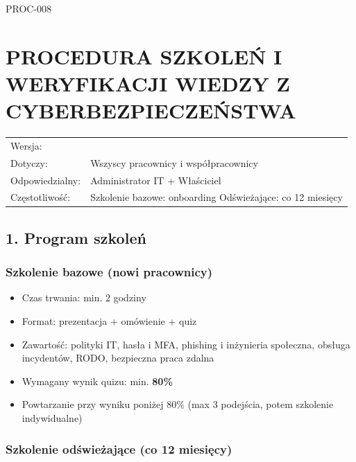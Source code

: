 \documentclass[12pt,a4paper]{article}
\providecommand{\tightlist}{\setlength{\itemsep}{0pt}\setlength{\parskip}{0pt}}
\begin{document}
\label{doc8}
PROC-008

\section{PROCEDURA SZKOLEŃ I WERYFIKACJI WIEDZY Z
CYBERBEZPIECZEŃSTWA}\label{procedura-szkoleux144-i-weryfikacji-wiedzy-z-cyberbezpieczeux144stwa}

\begin{longtable}[]{@{}>{\raggedright\arraybackslash}p{}>{\raggedright\arraybackslash}p{}@{}}
\toprule\noalign{}
\endhead
\bottomrule\noalign{}
\endlastfoot
Wersja: & 1.0 \\
Dotyczy: & Wszyscy pracownicy i współpracownicy \\
Odpowiedzialny: & Administrator IT + Właściciel \\
Częstotliwość: & Szkolenie bazowe: onboarding \textbar{} Odświeżające:
co 12 miesięcy \\
\end{longtable}

\subsection{1. Program szkoleń}\label{program-szkoleux144}

\subsubsection{Szkolenie bazowe (nowi
pracownicy)}\label{szkolenie-bazowe-nowi-pracownicy}

\begin{itemize}
\tightlist
\item
  Czas trwania: min. 2 godziny
\item
  Format: prezentacja + omówienie + quiz
\item
  Zawartość: polityki IT, hasła i MFA, phishing i inżynieria społeczna,
  obsługa incydentów, RODO, bezpieczna praca zdalna
\item
  Wymagany wynik quizu: min. \textbf{80\%}
\item
  Powtarzanie przy wyniku poniżej 80\% (max 3 podejścia, potem szkolenie
  indywidualne)
\end{itemize}

\subsubsection{Szkolenie odświeżające (co 12
miesięcy)}\label{szkolenie-odux15bwieux17cajux105ce-co-12-miesiux119cy}
\end{document}
